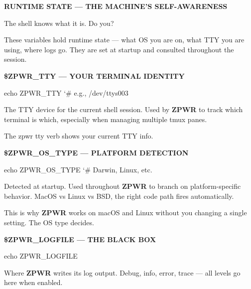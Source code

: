 \documentclass[11pt,a4paper,twoside]{book}
\begin{document}
\vspace{10pt}
{\large\bfseries\color{neoncyan} RUNTIME STATE — THE MACHINE'S SELF-AWARENESS}\vspace{6pt}

The shell knows what it is. Do you?

These variables hold runtime state — what OS you are on, what TTY you are using, where logs go. They are set at startup and consulted throughout the session.


\vspace{12pt}
{\bfseries\color{neonyellow} \$\textbf{ZPWR\_TTY} — YOUR TERMINAL IDENTITY}\vspace{4pt}

\begin{codebox}
\color{neongreen}echo ZPWR\_TTY   {\char`\#} e.g., /dev/ttys003\\
\end{codebox}

The TTY device for the current shell session. Used by \textbf{ZPWR} to track which terminal is which, especially when managing multiple tmux panes.

The zpwr tty verb shows your current TTY info.


\vspace{12pt}
{\bfseries\color{neonyellow} \$\textbf{ZPWR\_OS}\_TYPE — PLATFORM DETECTION}\vspace{4pt}

\begin{codebox}
\color{neongreen}echo ZPWR\_OS\_TYPE   {\char`\#} Darwin, Linux, etc.\\
\end{codebox}

Detected at startup. Used throughout \textbf{ZPWR} to branch on platform-specific behavior. MacOS vs Linux vs BSD, the right code path fires automatically.

This is why \textbf{ZPWR} works on macOS and Linux without you changing a single setting. The OS type decides.


\vspace{12pt}
{\bfseries\color{neonyellow} \$\textbf{ZPWR\_LOGFILE} — THE BLACK BOX}\vspace{4pt}

\begin{codebox}
\color{neongreen}echo ZPWR\_LOGFILE\\
\end{codebox}

Where \textbf{ZPWR} writes its log output. Debug, info, error, trace — all levels go here when enabled.
\end{document}
